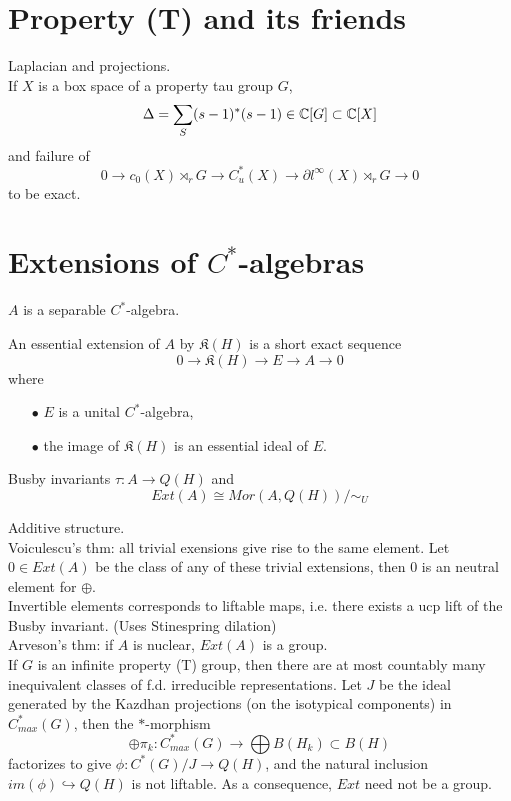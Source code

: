 \section{Property (T) and its friends}

Laplacian and projections.\\
If $X$ is a box space of a property tau group $G$,
\[\Delta = \sum_S (s-1)^*(s-1) \in \mathbb C [G] \subset \mathbb C[X]\]
and failure of 
\[ 0 \rightarrow c_0(X)\rtimes_r G \rightarrow C^*_u(X) \rightarrow \partial l^\infty (X)\rtimes_r G \rightarrow 0\]
to be exact.


\section{Extensions of $C^*$-algebras}

$A$ is a separable $C^*$-algebra.

\begin{definition}
An essential extension of $A$ by $\mathfrak K(H)$ is a short exact sequence
\[0 \rightarrow \mathfrak K(H) \rightarrow E \rightarrow A \rightarrow 0\] where
\begin{itemize}
\item[$\bullet$] $E$ is a unital $C^*$-algebra,
\item[$\bullet$] the image of $\mathfrak K(H)$ is an essential ideal of $E$.
\end{itemize}
\end{definition}

Busby invariants $\tau: A \rightarrow Q(H)$ and 
\[Ext(A) \cong Mor(A,Q(H)) / \sim_U\]

Additive structure.\\

Voiculescu's thm: all trivial exensions give rise to the same element. Let $0\in Ext(A)$ be the class of any of these trivial extensions, then $0$ is an neutral element for $\oplus$.\\

Invertible elements corresponds to liftable maps, i.e. there exists a ucp lift of the Busby invariant. (Uses Stinespring dilation)\\ 

Arveson's thm: if $A$ is nuclear, $Ext(A)$ is a group.\\

If $G$ is an infinite property (T) group, then there are at most countably many inequivalent classes of f.d. irreducible representations. Let $J$ be the ideal generated by the Kazdhan projections (on the isotypical components) in $C^*_{max}(G)$, then the $*$-morphism
\[\oplus \pi_k : C^*_{max}(G) \rightarrow \bigoplus B(H_k) \subset B(H)\]
factorizes to give $\phi: C^*(G)/J \rightarrow Q(H)$, and the natural inclusion $im(\phi) \hookrightarrow Q(H)$ is not liftable. As a consequence, $Ext$ need not be a group.\\

